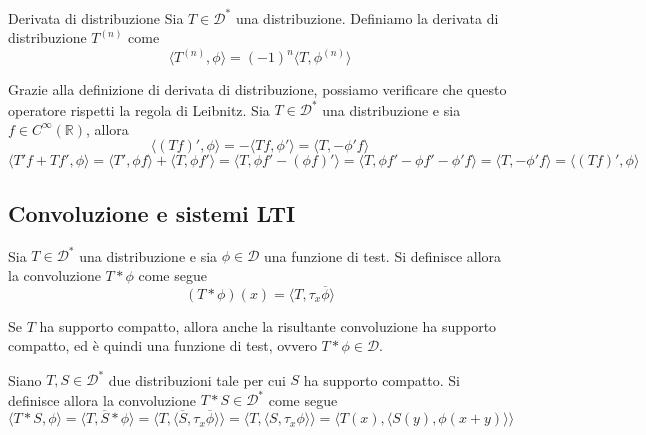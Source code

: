         \begin{definition}{Derivata di distribuzione}
            Sia $T \in \mathcal{D}^{*}$ una distribuzione.
            Definiamo la derivata di distribuzione $T^{(n)}$ come
            \[
                \langle T^{(n)}, \phi \rangle = (-1)^{n} \langle T, \phi^{(n)} \rangle
            \]
        \end{definition}

        Grazie alla definizione di derivata di distribuzione, possiamo verificare che questo operatore rispetti la regola di Leibnitz.
        Sia $T \in \mathcal{D}^{*}$ una distribuzione e sia $f \in C^{\infty}(\mathbb{R})$, allora
        \[
            \langle (T f)', \phi \rangle = -\langle T f, \phi' \rangle = \langle T, -\phi' f \rangle
        \]
        \[
            \langle T' f + T f', \phi \rangle = \langle T', \phi f \rangle + \langle T, \phi f' \rangle = \langle T, \phi f' - (\phi f)' \rangle = \langle T, \phi f' - \phi f' - \phi' f \rangle = \langle T, - \phi' f \rangle = \langle (T f)', \phi \rangle
        \]



\subsection{Convoluzione e sistemi LTI}
    \begin{definition}
        Sia $T \in \mathcal{D}^{*}$ una distribuzione e sia $\phi \in \mathcal{D}$ una funzione di test.
        Si definisce allora la convoluzione $T * \phi$ come segue
        \[
            (T * \phi) (x) = \langle T, \tau_{x} \overline{\phi} \rangle
        \]

        Se $T$ ha supporto compatto, allora anche la risultante convoluzione ha supporto compatto, ed è quindi una funzione di test, ovvero $T * \phi \in \mathcal{D}$.
    \end{definition}

    \begin{definition}
        Siano $T, S \in \mathcal{D}^{*}$ due distribuzioni tale per cui $S$ ha supporto compatto.
        Si definisce allora la convoluzione $T * S \in \mathcal{D}^{*}$ come segue
        \[
            \langle T * S, \phi \rangle = \langle T, \overline{S} * \phi \rangle = \langle T, \langle \overline{S}, \tau_{x} \overline{\phi} \rangle \rangle = \langle T, \langle S, \tau_{x} \phi \rangle \rangle = \langle T(x), \langle S(y), \phi (x + y) \rangle \rangle
        \]
    \end{definition}

